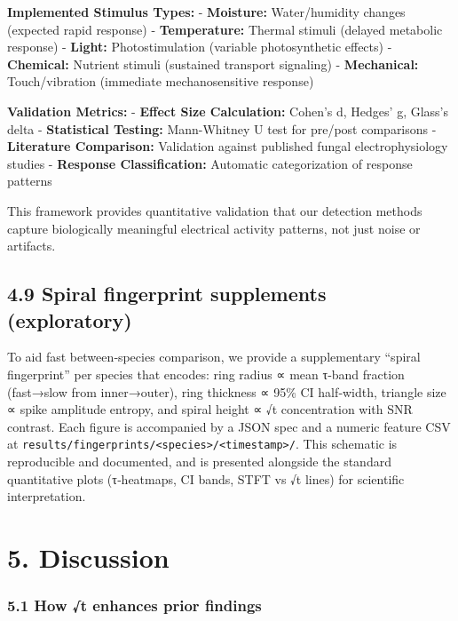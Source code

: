 \documentclass[
  11pt,
]{article}
\begin{document}
\textbf{Implemented Stimulus Types:} - \textbf{Moisture:} Water/humidity
changes (expected rapid response) - \textbf{Temperature:} Thermal
stimuli (delayed metabolic response) - \textbf{Light:} Photostimulation
(variable photosynthetic effects) - \textbf{Chemical:} Nutrient stimuli
(sustained transport signaling) - \textbf{Mechanical:} Touch/vibration
(immediate mechanosensitive response)

\textbf{Validation Metrics:} - \textbf{Effect Size Calculation:} Cohen's
d, Hedges' g, Glass's delta - \textbf{Statistical Testing:} Mann-Whitney
U test for pre/post comparisons - \textbf{Literature Comparison:}
Validation against published fungal electrophysiology studies -
\textbf{Response Classification:} Automatic categorization of response
patterns

This framework provides quantitative validation that our detection
methods capture biologically meaningful electrical activity patterns,
not just noise or artifacts.

\hypertarget{spiral-fingerprint-supplements-exploratory}{%
\subsection{4.9 Spiral fingerprint supplements
(exploratory)}\label{spiral-fingerprint-supplements-exploratory}}

To aid fast between‑species comparison, we provide a supplementary
``spiral fingerprint'' per species that encodes: ring radius ∝ mean
τ‑band fraction (fast→slow from inner→outer), ring thickness ∝ 95\% CI
half‑width, triangle size ∝ spike amplitude entropy, and spiral height ∝
√t concentration with SNR contrast. Each figure is accompanied by a JSON
spec and a numeric feature CSV at
\texttt{results/fingerprints/\textless{}species\textgreater{}/\textless{}timestamp\textgreater{}/}.
This schematic is reproducible and documented, and is presented
alongside the standard quantitative plots (τ‑heatmaps, CI bands, STFT vs
√t lines) for scientific interpretation.

\hypertarget{discussion}{%
\section{5. Discussion}\label{discussion}}

\hypertarget{how-t-enhances-prior-findings}{%
\subsubsection{5.1 How √t enhances prior
findings}\label{how-t-enhances-prior-findings}}
\end{document}
